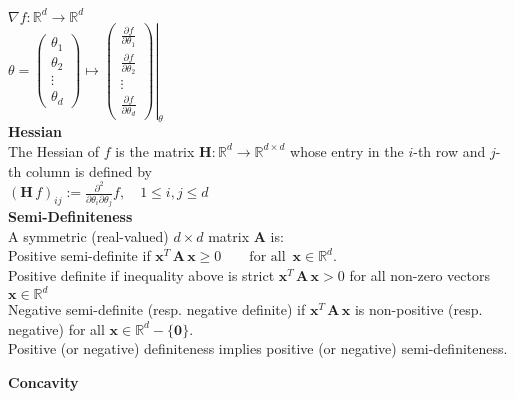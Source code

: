 $\nabla f:\mathbb {R}^ d \rightarrow \mathbb {R}^ d $\\
$\displaystyle \theta =\begin{pmatrix} \theta _1\\ \theta _2\\ \vdots \\ \theta _ d\end{pmatrix} \displaystyle \mapsto \displaystyle \left.\begin{pmatrix}  \frac{\partial f }{\partial \theta _1}\\ \frac{\partial f }{\partial \theta _2}\\ \vdots \\ \frac{\partial f }{\partial \theta _ d}\end{pmatrix}\right|_{\theta }$\\
\textbf{Hessian}\\
The Hessian of $f$ is the matrix $\mathbf{H}: \mathbb {R}^ d \to \mathbb {R}^{d\times d}$ whose entry in the $i$-th row and $j$-th column is defined by\\

$\left(\mathbf{H}\, f\right)_{ij} := \frac{\partial ^2}{\partial \theta _ i \partial \theta _ j} f, \quad 1 \leq i, j \leq d$\\

\textbf{Semi-Definiteness}\\	 	 

A symmetric (real-valued) $d\times d$  matrix $\mathbf{A}$ is:\\

Positive semi-definite if $\mathbf{x}^ T \, \mathbf{A}\, \mathbf{x} \geq 0\qquad \text {for all }\,  \mathbf{x}\in \mathbb {R}^ d.$\\

Positive definite if inequality above is strict $\mathbf{x}^ T \, \mathbf{A}\, \mathbf{x}> 0$ for all non-zero vectors $\mathbf{x}\in \mathbb {R}^ d$\\

Negative semi-definite (resp. negative definite) if $\mathbf{x}^ T \, \mathbf{A}\, \mathbf{x}$ is non-positive (resp. negative) for all $\mathbf{x}\in \mathbb {R}^ d-\{ \mathbf{0}\}$.\\

Positive (or negative) definiteness implies positive (or negative) semi-definiteness.

\textbf{Concavity}\\


	